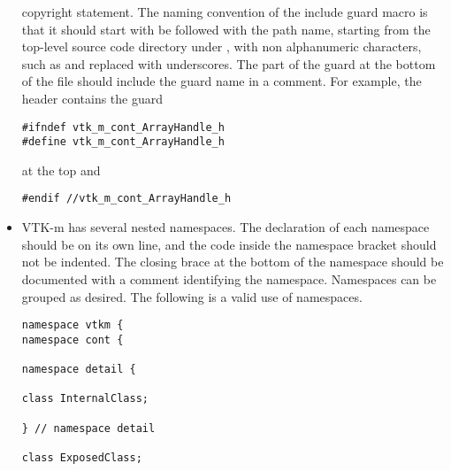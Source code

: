 \begin{itemize}
  copyright statement. The naming convention of the include guard macro is
  that it should start with  be followed with the path
  name, starting from the top-level source code directory under
  , with non alphanumeric characters, such as
  \textcode{/} and  replaced with underscores. The
   part of the guard at the bottom of the file should
  include the guard name in a comment. For example, the
   header contains the guard
\begin{verbatim}
#ifndef vtk_m_cont_ArrayHandle_h
#define vtk_m_cont_ArrayHandle_h
\end{verbatim}
  at the top and
\begin{verbatim}
#endif //vtk_m_cont_ArrayHandle_h
\end{verbatim}
\item VTK-m has several nested namespaces. The declaration of each
  namespace should be on its own line, and the code inside the namespace
  bracket should not be indented. The closing brace at the bottom of the
  namespace should be documented with a comment identifying the
  namespace. Namespaces can be grouped as desired. The following is a valid
  use of namespaces.
\begin{verbatim}
namespace vtkm {
namespace cont {

namespace detail {

class InternalClass;

} // namespace detail

class ExposedClass;


\end{verbatim}
\end{itemize}
